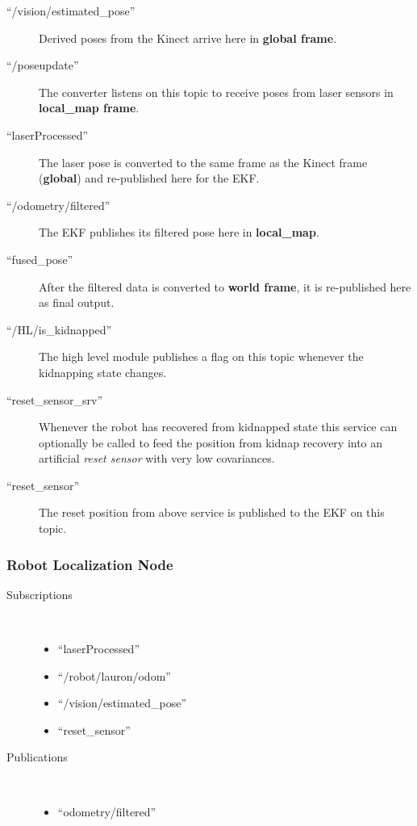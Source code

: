 \begin{description}
\item[``/vision/estimated\_pose''] Derived poses from the Kinect arrive here in \textbf{global frame}.
\item[``/poseupdate''] The converter listens on this topic to receive poses from laser sensors in \textbf{local\_map frame}. 
\item[``laserProcessed''] The laser pose is converted to the same frame as the Kinect frame (\textbf{global}) and re-published here for the EKF.
\item[``/odometry/filtered''] The EKF publishes its filtered pose here in \textbf{local\_map}.
\item[``fused\_pose''] After the filtered data is converted to \textbf{world frame}, it is re-published here as final output.
\item[``/HL/is\_kidnapped''] The high level module publishes a flag on this topic whenever the kidnapping state changes.
\item[``reset\_sensor\_srv''] Whenever the robot has recovered from kidnapped state this service can optionally be called to feed the position from kidnap recovery  into an artificial \textit{reset sensor} with very low covariances.
\item[``reset\_sensor''] The reset position from above service is published to the EKF on this topic.
\end{description}

\subsubsection{Robot Localization Node}
\begin{description}
\item[Subscriptions]\
\begin{itemize}
	\item ``laserProcessed''
	\item``/robot/lauron/odom''
	\item ``/vision/estimated\_pose''
	 \item ``reset\_sensor'' 
\end{itemize}
	
\item[Publications]\
	\begin{itemize}
	\item ``odometry/filtered''
	\end{itemize}
\end{description}

